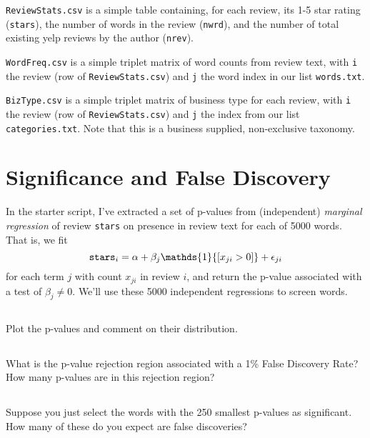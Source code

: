 \documentclass[12pt]{article}
\newcommand{\ds}[1]{\mathds{#1}}
\begin{document}
\medskip\noindent
{\tt ReviewStats.csv} is a simple table containing, for each review, its 1-5 star rating ({\tt stars}), the number of words in the review ({\tt nwrd}), and the number of total existing yelp reviews by the author ({\tt nrev}).

\medskip\noindent
{\tt WordFreq.csv} is a simple triplet matrix of word counts from review text, with {\tt i} the review (row of {\tt ReviewStats.csv}) and {\tt j} the word index in our list {\tt words.txt}.  

\medskip\noindent
{\tt BizType.csv} is a simple triplet matrix of business type for each review, with {\tt i} the review (row of {\tt ReviewStats.csv}) and {\tt j} the index from our list {\tt categories.txt}.  Note that this is a business supplied, non-exclusive taxonomy.


\newpage
\section{Significance and False Discovery}

In the starter script, I've extracted a set of p-values
from (independent) {\it marginal regression}  of review {\tt stars} on  presence  in review text for each of  5000 words.  That is, we fit
\[
{\tt stars}_i = \alpha + \beta_j \ds{1}{[x_{ji}>0]} + \epsilon_{ji}
\]
for each term $j$ with count $x_{ji}$ in review $i$, and return the p-value associated with a test of $\beta_{j}\neq0$. We'll use these 5000 independent regressions to screen words.

\subsection{} Plot the p-values and comment on their distribution.

\subsection{} What is the p-value rejection region associated with a 1\% False Discovery Rate?  \\How many p-values are in this rejection region?

\subsection{} Suppose you just select the words with the 250 smallest p-values as significant.\\ How many of these do you expect are false discoveries?
\end{document}
